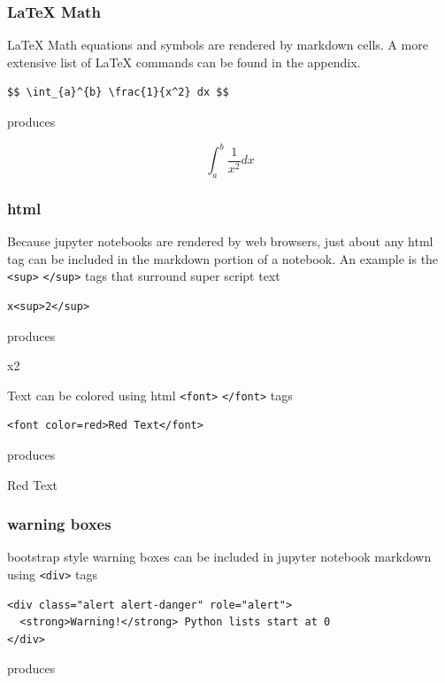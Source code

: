 \documentclass{book}
\begin{document}
\subsubsection{LaTeX Math}\label{latex-math}

LaTeX Math equations and symbols are rendered by markdown cells. A more
extensive list of LaTeX commands can be found in the appendix.

\begin{lstlisting}
$$ \int_{a}^{b} \frac{1}{x^2} dx $$
\end{lstlisting}

produces

\[ \int_{a}^{b} \frac{1}{x^2} dx \]

\subsubsection{html}\label{html}

Because jupyter notebooks are rendered by web browsers, just about any
html tag can be included in the markdown portion of a notebook. An
example is the \lstinline!<sup>! \lstinline!</sup>! tags that surround
super script text

\begin{lstlisting}
x<sup>2</sup>
\end{lstlisting}

produces

x2

Text can be colored using html \lstinline!<font>! \lstinline!</font>!
tags

\begin{lstlisting}
<font color=red>Red Text</font>
\end{lstlisting}

produces

Red Text

\subsubsection{warning boxes}\label{warning-boxes}

bootstrap style warning boxes can be included in jupyter notebook
markdown using \lstinline!<div>! tags

\begin{lstlisting}
<div class="alert alert-danger" role="alert">
  <strong>Warning!</strong> Python lists start at 0
</div>
\end{lstlisting}

produces
\end{document}
